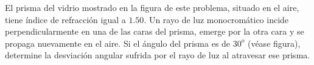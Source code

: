 
El prisma del vidrio mostrado en la figura de este problema, situado en el aire, tiene índice de refracción igual a $1.50$. Un rayo de luz monocromático incide perpendicularmente en una de las caras del prisma, emerge por la otra cara y se propaga nuevamente en el aire. Si el ángulo del prisma es de $30^o$ (véase figura), determine la desviación angular sufrida por el rayo de luz al atravesar ese prisma.